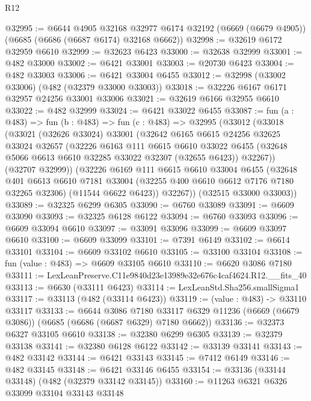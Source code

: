 \begin{lexlean}{R12}
\begin{coremodule}
@32995 := @6644
    @4905
    @32168
    @32977
    @6174
    @32192
    (@6669 (@6679 @4905))
    (@6685 (@6686 (@6687 @6174) @32168 @6662))
@32998 := @32619 @6172 @32959 @6610
@32999 := @32623 @6423
@33000 := @32638 @32999
@33001 := @482 @33000
@33002 := @6421 @33001
@33003 := @20730 @6423
@33004 := @482 @33003
@33006 := @6421 @33004 @6455
@33012 := @32998 (@33002 @33006) (@482 (@32379 @33000 @33003))
@33018 := @32226 @6167 @6171 @32957 @24256 @33001 @33006
@33021 := @32619 @6166 @32955 @6610
@33022 := @482 @32999
@33024 := @6421 @33022 @6455
@33087 := fun (a : @483) =>
  fun (b : @483) =>
  fun (c : @483) =>
  @32995
    (@33012
      (@33018
        (@33021
          (@32626 @33024)
          @33001
          (@32642
            @6165
            @6615
            @24256
            @32625
            @33024
            @32657
            (@32226
              @6163
              @111
              @6615
              @6610
              @33022
              @6455
              (@32648 @5066 @6613 @6610 @32285 @33022 @32307 (@32655 @6423))
              @32267))
          (@32707 @32999))
        (@32226
          @6169
          @111
          @6615
          @6610
          @33004
          @6455
          (@32648
            @401
            @6613
            @6610
            @7181
            @33004
            (@32255 @400 @6610 @6612 @7176 @7180 @32265 @32306)
            (@11544 @6622 @6423))
          @32267))
      (@32515 @33000 @33003))
@33089 := @32325 @6299 @6305
@33090 := @6760 @33089
@33091 := @6609 @33090
@33093 := @32325 @6128 @6122
@33094 := @6760 @33093
@33096 := @6609 @33094 @6610
@33097 := @33091 @33096
@33099 := @6609 @33097 @6610
@33100 := @6609 @33099
@33101 := @7391 @6149
@33102 := @6614 @33101
@33104 := @6609 @33102 @6610
@33105 := @33100 @33104
@33108 := fun (value : @483) => @6609 @33105 @6610
@33110 := @6620 @3086 @7180
@33111 := LexLeanPreserve.C11e9840d23e13989e32e676c4caf4624.R12.__fits_40
@33113 := @6630 (@33111 @6423)
@33114 := LexLeanStd.Sha256.smallSigma1
@33117 := @33113 (@482 (@33114 @6423))
@33119 := (value : @483) -> @33110 @33117
@33133 := @6644
    @3086
    @7180
    @33117
    @6329
    @11236
    (@6669 (@6679 @3086))
    (@6685 (@6686 (@6687 @6329) @7180 @6662))
@33136 := @32373 @6327 @33105 @6610
@33138 := @32380 @6299 @6305
@33139 := @32379 @33138
@33141 := @32380 @6128 @6122
@33142 := @33139 @33141
@33143 := @482 @33142
@33144 := @6421 @33143
@33145 := @7412 @6149
@33146 := @482 @33145
@33148 := @6421 @33146 @6455
@33154 := @33136 (@33144 @33148) (@482 (@32379 @33142 @33145))
@33160 := @11263 @6321 @6326 @33099 @33104 @33143 @33148

\end{coremodule}
\end{lexlean}
